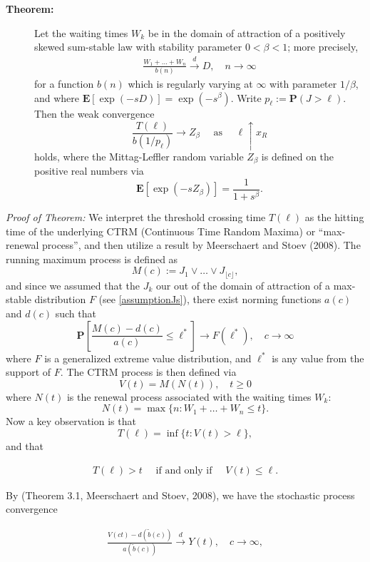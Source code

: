 \documentclass[]{elsarticle} %
\begin{document}
\begin{description}
\item[\textbf{Theorem:}]
Let the waiting times \(W_k\) be in the domain of attraction of a
positively skewed sum-stable law with stability parameter
\(0 < \beta < 1\); more precisely, \begin{align} \label{eq:stability}
\frac{W_1 + \ldots + W_n}{b(n)} \overset{d}{\longrightarrow} D, 
\quad n \to \infty
\end{align} for a function \(b(n)\) which is regularly varying at
\(\infty\) with parameter \(1/\beta\), and where
\(\mathbf E[\exp(-sD)] = \exp(-s^\beta)\). Write
\(p_{\ell} := \mathbf P(J > \ell)\). Then the weak convergence \[
\frac{T(\ell)} {b(1/p_{\ell})} \to Z_\beta \quad \text{ as } \quad \ell \uparrow x_R
\] holds, where the Mittag-Leffler random variable \(Z_\beta\) is
defined on the positive real numbers via \[
\mathbf E[\exp(-sZ_\beta)] = \frac{1}{1+s^\beta}.
\]
\end{description}

\emph{Proof of Theorem:} We interpret the threshold crossing time
\(T(\ell)\) as the hitting time of the underlying CTRM (Continuous Time
Random Maxima) or ``max-renewal process'', and then utilize a result by
Meerschaert and Stoev (2008). The running maximum process is defined as
\[
M(c) := J_1 \vee \ldots \vee J_{\lfloor c \rfloor},
\] and since we assumed that the \(J_k\) our out of the domain of
attraction of a max-stable distribution \(F\) (see
\eqref{assumptionJs}), there exist norming functions \(a(c)\) and
\(d(c)\) such that \[
\mathbf P\left[ \frac{M(c) - d(c)}{a(c)} \le \ell^* \right] 
\longrightarrow F(\ell^*), \quad c \to \infty
\] where \(F\) is a generalized extreme value distribution, and
\(\ell^*\) is any value from the support of \(F\). The CTRM process is
then defined via \[
V(t) = M(N(t)), \quad t \ge 0
\] where \(N(t)\) is the renewal process associated with the waiting
times \(W_k\): \[
N(t) = \max\{n: W_1 + \ldots + W_n \le t\}.
\] Now a key observation is that \[
T(\ell) = \inf\{t: V(t) > \ell\}, 
\] and that

\begin{align}
T(\ell) > t \quad \text{ if and only if } \quad V(t) \le \ell. \label{inverserelat}
\end{align}

By (Theorem 3.1, Meerschaert and Stoev, 2008), we have the stochastic
process convergence

\begin{align}
\frac{V(ct) - d(\tilde b(c))}{a(\tilde b(c))} 
\stackrel{d}{\longrightarrow} Y(t),  \quad c \to \infty, \label{TheoMS}
\end{align}
\end{document}
